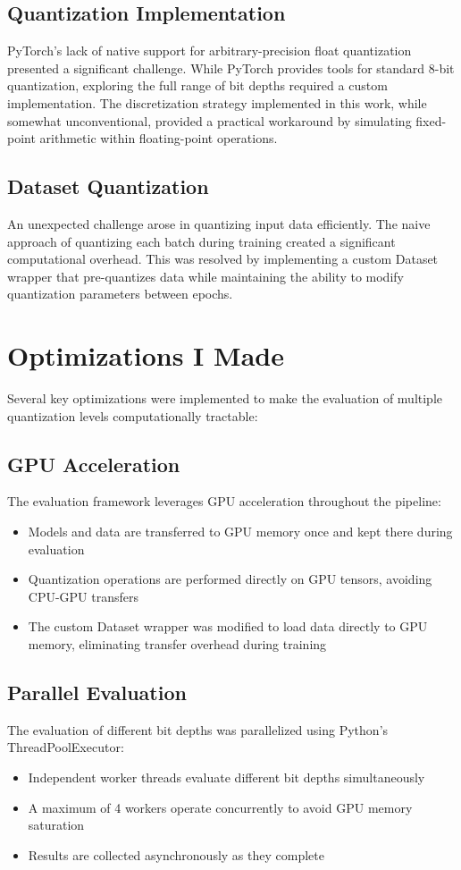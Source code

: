 \documentclass[twocolumn]{article}
\begin{document}
\subsection{Quantization Implementation}
PyTorch's lack of native support for arbitrary-precision float quantization
presented a significant challenge. While PyTorch provides tools for standard
8-bit quantization, exploring the full range of bit depths required a custom
implementation. The discretization strategy implemented in this work, while
somewhat unconventional, provided a practical workaround by simulating
fixed-point arithmetic within floating-point operations.
\subsection{Dataset Quantization}
An unexpected challenge arose in quantizing input data efficiently. The naive
approach of quantizing each batch during training created a significant
computational overhead. This was resolved by implementing a custom Dataset
wrapper that pre-quantizes data while maintaining the ability to modify
quantization parameters between epochs.

\section{Optimizations I Made}
Several key optimizations were implemented to make the evaluation of multiple
quantization levels computationally tractable:
\subsection{GPU Acceleration}
The evaluation framework leverages GPU acceleration throughout the pipeline:
\begin{itemize}
\item Models and data are transferred to GPU memory once and kept there during
evaluation
\item Quantization operations are performed directly on GPU tensors, avoiding
CPU-GPU transfers
\item The custom Dataset wrapper was modified to load data directly to GPU
memory, eliminating transfer overhead during training
\end{itemize}
\subsection{Parallel Evaluation}
The evaluation of different bit depths was parallelized using Python's
ThreadPoolExecutor:
\begin{itemize}
\item Independent worker threads evaluate different bit depths simultaneously
\item A maximum of 4 workers operate concurrently to avoid GPU memory saturation
\item Results are collected asynchronously as they complete
\end{itemize}
\end{document}
